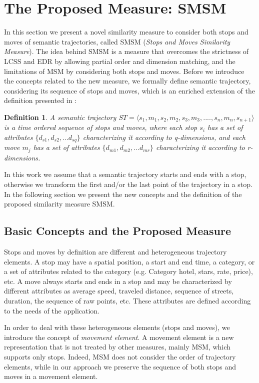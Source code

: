 \documentclass[12pt]{article}
\newtheorem{definition}{Definition}
\begin{document}
\section{The Proposed Measure: SMSM} \label{sec:proposed_measure}
In this section we present a novel similarity measure to consider both stops and moves of semantic trajectories, called SMSM (\textit{Stops and Moves Similarity Measure}). The idea behind SMSM is a measure that overcomes the strictness of LCSS and EDR by allowing partial order and dimension matching, and the limitations of MSM by considering both stops and moves. Before we introduce the concepts related to the new measure, we formally define semantic trajectory, considering its sequence of stops and moves, which is an enriched extension of the definition presented in \cite{Spaccapietra:2008:CVT:1347466.1347785}:


\begin{definition}
\label{def:semantic_trajectory}
A semantic trajectory  $ST=\langle s_1, m_1, s_2, m_2, s_3,m_3, ...., s_n, m_n, s_{n+1} \rangle$ is a time ordered sequence of stops and moves, where each stop $s_i$ has a set of attributes $\{d_{s1}, d_{s2}, ...d_{sq}\}$ characterizing it according to q-dimensions, and each move $m_j$  has a set of attributes $\{d_{m1}, d_{m2}, ...d_{mr}\}$  characterizing it according to r-dimensions. 
\end{definition}

In this work we assume that a semantic trajectory starts and ends with a stop, otherwise we transform the first and/or the last point of the trajectory in a stop. In the following section we present the new concepts and the definition of the proposed similarity measure SMSM.
\subsection{Basic Concepts and the Proposed Measure}

Stops and moves by definition are different and heterogeneous trajectory elements. A stop may have a spatial position, a start and end time, a category, or a set of attributes related to the category (e.g. Category hotel, stars, rate, price), etc. A move always starts and ends in a stop and may be characterized by different attributes as average speed, traveled distance, sequence of streets, duration, the sequence of raw points, etc. These attributes are defined according to the needs of the application. 

In order to deal with these heterogeneous elements (stops and moves), we introduce the concept of \emph{movement element}. A movement element is a new representation that is not treated by other measures, mainly MSM, which supports only stops. Indeed, MSM does not consider the order of trajectory elements, while in our approach we preserve the sequence of both stops and moves in a movement element.
\end{document}
